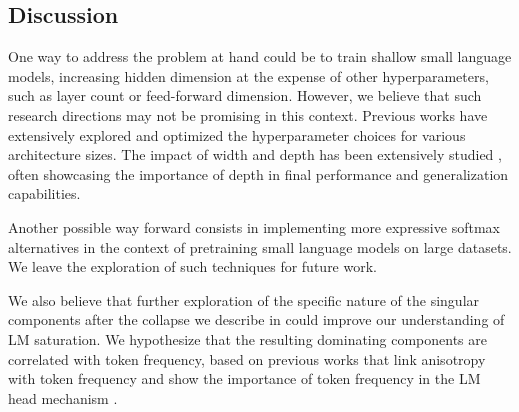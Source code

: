 \newpage
\subsection{Discussion}


One way to address the problem at hand could be to train shallow small language models, increasing hidden dimension at the expense of other hyperparameters, such as layer count or feed-forward dimension. However, we believe that such research directions may not be promising in this context. Previous works have extensively explored and optimized the hyperparameter choices for various architecture sizes. The impact of width and depth has been extensively studied \citep{merrill-etal-2022-saturated, tay2022scale, petty2023impact}, often showcasing the importance of depth in final performance and generalization capabilities.

Another possible way forward consists in implementing more expressive softmax alternatives \citep{softmax_bottleneck,chang-mccallum-2022-softmax} in the context of pretraining small language models on large datasets. We leave the exploration of such techniques for future work.

We also believe that further exploration of the specific nature of the singular components after the collapse we describe in  could improve our understanding of LM saturation. We hypothesize that the resulting dominating components are correlated with token frequency, based on previous works that link anisotropy with token frequency \citep{gao2018representation,ethayarajh-2019-contextual,bis-etal-2021-much} and show the importance of token frequency in the LM head mechanism \citep{meister-etal-2023-natural}.

